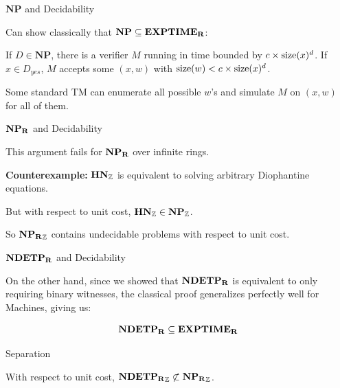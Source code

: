 \documentclass[c]{beamer}
\begin{document}
\begin{frame}{$\mathbf{NP}$ and Decidability}

  Can show classically that $\mathbf{NP} \subseteq \mathbf{EXPTIME_R}$:

  \vspace{\baselineskip}

  If $D \in \mathbf{NP}$, there is a verifier $M$ running in time
  bounded by $c \times \text{size}(x)^d$.  If $x \in D_{yes}$, $M$ accepts some
  $(x,w)$ with $\text{size}(w) < c \times \text{size}(x)^d$. \pause

  \vspace{\baselineskip}

  Some standard TM can enumerate all possible $w$'s and simulate $M$
  on $(x,w)$ for all of them.
\end{frame}

\begin{frame}{$\mathbf{NP_R}$ and Decidability}

  This argument fails for $\mathbf{NP_R}$ over infinite rings.\pause

  \vspace{\baselineskip}

  \textbf{Counterexample:} $\mathbf{HN}_{\mathbb{Z}}$ is equivalent to solving
  arbitrary Diophantine equations. \pause

  \vspace{\baselineskip}

  But with respect to unit cost, $\mathbf{HN}_{\mathbb{Z}} \in
  \mathbf{NP_{\mathbb{Z}}}$.

  \vspace{\baselineskip}

  So $\mathbf{NP_R}_{\mathbb{Z}}$ contains undecidable problems with respect to
  unit cost.

\end{frame}

\begin{frame}{$\mathbf{NDETP_R}$ and Decidability}

  On the other hand, since we showed that $\mathbf{NDETP_R}$ is equivalent to
  only requiring binary witnesses, the classical proof generalizes
  perfectly well for \ndet Machines, giving us:

  $$\mathbf{NDETP_R} \subseteq \mathbf{EXPTIME_R}$$
  
\end{frame}

\begin{frame}{Separation}
  \begin{corollary}
    With respect to unit cost, $\mathbf{NDETP_R}_{\mathbb{Z}} \not\subset \mathbf{NP_R}_{\mathbb{Z}}$.
  \end{corollary}
\end{frame}
\end{document}
